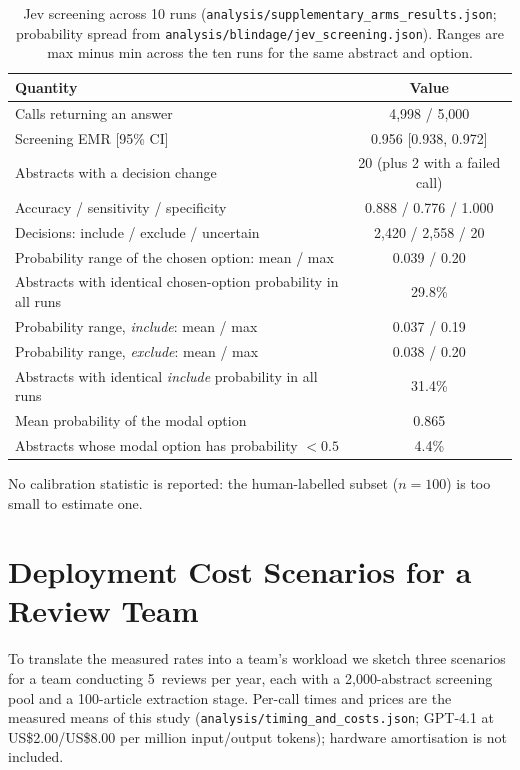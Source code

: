 \documentclass[11pt]{article}
\newenvironment{fittab}{\begin{lrbox}{\fittabbox}}{\end{lrbox}%
  \ifdim\wd\fittabbox>\linewidth\resizebox{\linewidth}{!}{\usebox{\fittabbox}}\else\usebox{\fittabbox}\fi}
\begin{document}
\begin{table}[htbp]
\centering
\caption{Jev screening across 10 runs (\texttt{analysis/supplementary\_arms\_results.json}; probability spread from \texttt{analysis/blindage/jev\_screening.json}). Ranges are max minus min across the ten runs for the same abstract and option.}
\label{tab:jev}
\begin{fittab}\begin{tabular}{lc}
\toprule
\textbf{Quantity} & \textbf{Value} \\
\midrule
Calls returning an answer          & 4{,}998 / 5{,}000 \\
Screening EMR [95\% CI]            & 0.956 [0.938, 0.972] \\
Abstracts with a decision change   & 20 (plus 2 with a failed call) \\
Accuracy / sensitivity / specificity & 0.888 / 0.776 / 1.000 \\
Decisions: include / exclude / uncertain & 2{,}420 / 2{,}558 / 20 \\
Probability range of the chosen option: mean / max & 0.039 / 0.20 \\
Abstracts with identical chosen-option probability in all runs & 29.8\% \\
Probability range, \emph{include}: mean / max & 0.037 / 0.19 \\
Probability range, \emph{exclude}: mean / max & 0.038 / 0.20 \\
Abstracts with identical \emph{include} probability in all runs & 31.4\% \\
Mean probability of the modal option & 0.865 \\
Abstracts whose modal option has probability $<0.5$ & 4.4\% \\
\bottomrule
\end{tabular}\end{fittab}
\end{table}

\noindent No calibration statistic is reported: the human-labelled subset ($n{=}100$) is too small to estimate one.

\section{Deployment Cost Scenarios for a Review Team}
\label{sec:costbenefit_supp}

To translate the measured rates into a team's workload we sketch three scenarios for a team conducting 5~reviews per year, each with a 2{,}000-abstract screening pool and a 100-article extraction stage. Per-call times and prices are the measured means of this study (\texttt{analysis/timing\_and\_costs.json}; GPT-4.1 at US\$2.00/US\$8.00 per million input/output tokens); hardware amortisation is not included.
\end{document}
